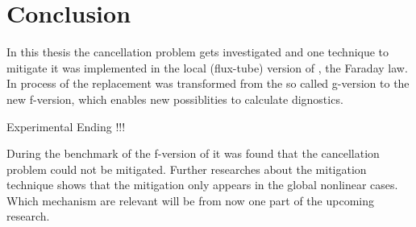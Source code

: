 
\NewPage
\chapter{Conclusion}
\label{chap:close}

\thispagestyle{empty}
\newpage

In this thesis the cancellation problem gets investigated and one technique to mitigate it was implemented in the local (flux-tube) version of {\gkw}, the Faraday law. In process of the replacement {\gkw} was transformed from the so called g-version to the new f-version, which enables new possiblities to calculate dignostics. 

Experimental Ending !!!

During the benchmark of the f-version of {\gkw} it was found that the cancellation problem could not be mitigated. Further researches about the mitigation technique shows that the mitigation only appears in the global nonlinear cases. Which mechanism are relevant will be from now one part of the upcoming research. 